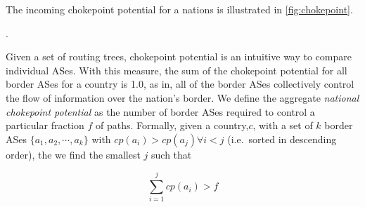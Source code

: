 The incoming chokepoint
potential for a nations is illustrated in \figurename
\ref{fig:chokepoint}.

.

Given a set of routing trees, chokepoint potential is an intuitive way to
compare individual ASes. With this measure, the sum of the chokepoint potential
for all border ASes for a country is 1.0, as in, all of the border ASes
collectively control the flow of information over the nation's border. We
define the aggregate \emph{national chokepoint potential} as the number of
border ASes required to control a particular fraction $f$ of paths. Formally,
given a country,$c$, with a set of $k$ border ASes $\{a_1,a_2,\cdots,a_k\}$ with
$cp(a_i)>cp(a_j) \forall i<j$ (i.e.\ sorted in descending order), the
we find the smallest $j$ such that 

\begin{equation}
  \label{eq:nationalchokepoint}
  \sum_{i=1}^j cp(a_i) > f
\end{equation}

